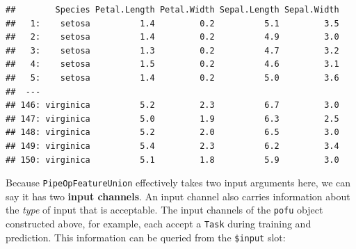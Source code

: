 \documentclass[
]{scrbook}
\newenvironment{Shaded}{\begin{snugshade}}{\end{snugshade}}
\newcommand{\AttributeTok}[1]{\textcolor[rgb]{0.77,0.63,0.00}{#1}}
\newcommand{\DecValTok}[1]{\textcolor[rgb]{0.00,0.00,0.81}{#1}}
\newcommand{\FunctionTok}[1]{\textcolor[rgb]{0.00,0.00,0.00}{#1}}
\newcommand{\NormalTok}[1]{#1}
\newcommand{\OtherTok}[1]{\textcolor[rgb]{0.56,0.35,0.01}{#1}}
\newcommand{\SpecialCharTok}[1]{\textcolor[rgb]{0.00,0.00,0.00}{#1}}
\newcommand{\StringTok}[1]{\textcolor[rgb]{0.31,0.60,0.02}{#1}}
\renewenvironment{Shaded} {\begin{snugshade}\small} {\end{snugshade}}
\begin{document}
\begin{Shaded}
\end{Shaded}

\begin{verbatim}
##        Species Petal.Length Petal.Width Sepal.Length Sepal.Width
##   1:    setosa          1.4         0.2          5.1         3.5
##   2:    setosa          1.4         0.2          4.9         3.0
##   3:    setosa          1.3         0.2          4.7         3.2
##   4:    setosa          1.5         0.2          4.6         3.1
##   5:    setosa          1.4         0.2          5.0         3.6
##  ---                                                            
## 146: virginica          5.2         2.3          6.7         3.0
## 147: virginica          5.0         1.9          6.3         2.5
## 148: virginica          5.2         2.0          6.5         3.0
## 149: virginica          5.4         2.3          6.2         3.4
## 150: virginica          5.1         1.8          5.9         3.0
\end{verbatim}

Because \texttt{PipeOpFeatureUnion} effectively takes two input arguments here, we can say it has two \textbf{input channels}.
An input channel also carries information about the \emph{type} of input that is acceptable.
The input channels of the \texttt{pofu} object constructed above, for example, each accept a \texttt{Task} during training and prediction.
This information can be queried from the \texttt{\$input} slot:
\end{document}
